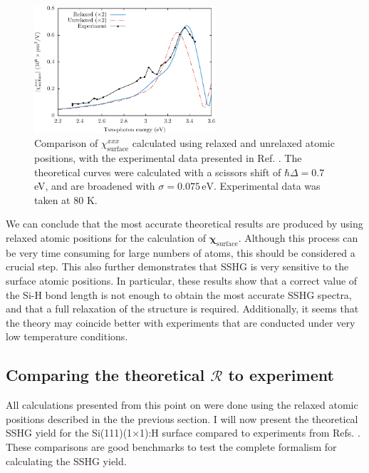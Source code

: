 \begin{figure}[t]
\centering
\includegraphics[width=0.6\textwidth]{content/figures/fig-Si1x1-Hofer_Xxxx}
\caption{Comparison of
$\chi^{xxx}_{\mathrm{surface}}$ calculated using relaxed and unrelaxed
atomic positions, with the experimental data presented in Ref.
\cite{hoferAPA96}. The theoretical curves were calculated with a scissors shift
of $\hbar\Delta = 0.7$ eV, and are broadened with $\sigma=0.075\,\text{eV}$.
Experimental data was taken at 80 K.}
\label{fig:Xxxx}
\end{figure}

We can conclude that the most accurate theoretical results are produced by using
relaxed atomic positions for the calculation of
$\boldsymbol{\chi}_{\mathrm{surface}}$. Although this process can be very time
consuming for large numbers of atoms, this should be considered a crucial step.
This also further demonstrates that SSHG is very sensitive to the surface atomic
positions. In particular, these results show that a correct value of the Si-H
bond length is not enough to obtain the most accurate SSHG spectra, and that a
full relaxation of the structure is required. Additionally, it seems that the
theory may coincide better with experiments that are conducted under very low
temperature conditions.



\subsection{Comparing the theoretical \texorpdfstring{$\mathcal{R}$}{R} to
experiment}
\label{sec:1x1sshgyield}

All calculations presented from this point on were done using the relaxed atomic
positions described in the the previous section. I will now present the
theoretical SSHG yield for the Si(111)(1$\times$1):H surface compared to
experiments from Refs. \cite{mitchellSS01, mejiaPRB02, bergfeldPRL04}. These
comparisons are good benchmarks to test the complete formalism for calculating
the SSHG yield.

